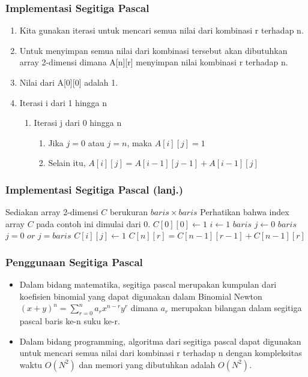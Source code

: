 \begin{frame}
\frametitle{Implementasi Segitiga Pascal}
\begin{enumerate}
  \item Kita gunakan iterasi untuk mencari semua nilai dari kombinasi r terhadap n.
  \item Untuk menyimpan semua nilai dari kombinasi tersebut akan dibutuhkan array 2-dimensi dimana A[n][r] menyimpan nilai kombinasi r terhadap n.
  \item Nilai dari A[0][0] adalah 1.
  \item Iterasi i dari 1 hingga n
  \begin{enumerate}
    \item Iterasi j dari 0 hingga n
    \begin{enumerate}
      \item Jika $j = 0$ atau $j = n$, maka $A[i][j] = 1$
      \item Selain itu, $A[i][j] = A[i-1][j-1] + A[i-1][j]$
    \end{enumerate}
  \end{enumerate}
\end{enumerate}
\end{frame}

\begin{frame}[fragile]
\frametitle{Implementasi Segitiga Pascal (lanj.)}
\begin{codebox}
\li \Comment Sediakan array 2-dimensi $C$ berukuran $baris \times baris$
\li \Comment Perhatikan bahwa index array $C$ pada contoh ini dimulai dari 0.
\li $C[0][0] \gets 1$
\li \For $i \gets 1$ \To $baris$
    \Do
\li   \For $j \gets 0$ \To $baris$
      \Do
\li     \If $j = 0$ $or$ $j = baris$
        \Then
\li       $C[i][j] \gets 1$
\li     \Else
\li       $C[n][r] = C[n-1][r-1] + C[n-1][r]$
        \End
      \End
    \End
\end{codebox}
\end{frame}

\begin{frame}
\frametitle{Penggunaan Segitiga Pascal}
\begin{itemize}
  \item Dalam bidang matematika, segitiga pascal merupakan kumpulan dari koefisien binomial yang dapat digunakan dalam Binomial Newton $(x+y)^{n} = \sum\limits_{r=0}^{n} a_{r} x^{n-r} y^{r}$ dimana $a_{r}$ merupakan bilangan dalam segitiga pascal baris ke-n suku ke-r.
  \item Dalam bidang programming, algoritma dari segitiga pascal dapat digunakan untuk mencari semua nilai dari kombinasi r terhadap n dengan kompleksitas waktu $O(N^{2})$ dan memori yang dibutuhkan adalah $O(N^{2})$.
\end{itemize}
\end{frame}

